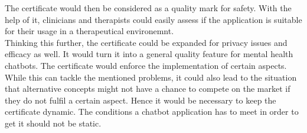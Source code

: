 \documentclass[sigconf, nonacm]{acmart}
\begin{document}
The certificate would then be considered as a quality mark for safety.
With the help of it, clinicians and therapists could easily assess if the application is suitable for their usage in a therapeutical environemnt.\\
Thinking this further, the certificate could be expanded for privacy issues and efficacy as well. It would turn it into a general quality feature for mental health chatbots. The certificate would enforce the implementation of certain aspects. While this can tackle the mentioned problems, it could also lead to the situation
that alternative concepts might not have a chance to compete on the market if they do not fulfil a certain aspect. Hence it would be necessary to keep the certificate dynamic. The conditions a chatbot application has to meet in order to get it should not be static.
\end{document}
